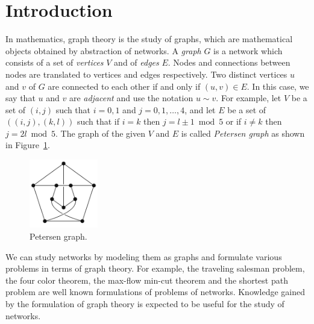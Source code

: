 \documentclass[conference]{IEEEtran}
\begin{document}
\section{Introduction}
In mathematics, graph theory is the study of graphs, which are mathematical objects
obtained by abstraction of networks.
A {\it graph} $G$ is a network which consists of a set of {\it vertices} $V$ and of {\it edges} $E$.
Nodes and connections between nodes are translated to vertices and edges respectively.
Two distinct vertices $u$ and $v$ of $G$ are connected to each other
if and only if $(u,v) \in E$. 
In this case, we say that $u$ and $v$ are {\it adjacent} and use the notation $u \sim v$.
For example, let $V$ be a set of $(i,j)$ such that $i = 0,1$ and $j=0,1, \ldots ,4$, and let $E$ be a set of $((i,j),(k,l))$
such that if $i=k$ then $j=l \pm 1 \bmod 5$ or if $i \neq k$ then $j = 2l \bmod 5$.
The graph of the given $V$ and $E$ is called {\it Petersen graph} as shown in Figure~\ref{fig:Petersen}.
\begin{figure}[]
\centering
\includegraphics[width=3cm]{petersen_gray.png}
\caption{ Petersen graph.}
\label{fig:Petersen}
\end{figure}
We can study networks by modeling them as graphs and formulate various problems in terms of graph theory.
For example, the traveling salesman problem, the four color theorem, the max-flow min-cut theorem
and the shortest path problem are well known formulations of problems of networks.
Knowledge gained by the formulation of graph theory is expected to be useful for the study of networks.
\end{document}
